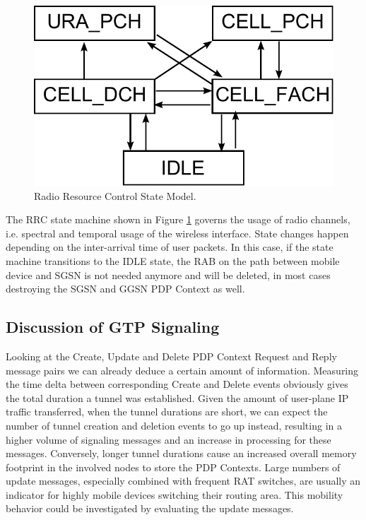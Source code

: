 \begin{figure}
	\centering
	\includegraphics[width=0.6\columnwidth]{images/CONEXT2012/rrc-state-model.pdf}
	\caption{Radio Resource Control State Model.}
	\label{fig:rrcstatemodel-CONEXT}
\end{figure}

The \ac{RRC} state machine shown in Figure \ref{fig:rrcstatemodel-CONEXT} governs the usage of radio channels, i.e. spectral and temporal usage of the wireless interface. State changes happen depending on the inter-arrival time of user packets. In this case, if the state machine transitions to the IDLE state, the \ac{RAB} on the path between mobile device and \ac{SGSN} is not needed anymore and will be deleted, in most cases destroying the SGSN and GGSN PDP Context as well.




\subsection{Discussion of GTP Signaling}

Looking at the Create, Update and Delete PDP Context Request and Reply message pairs we can already deduce a certain amount of information. Measuring the time delta between corresponding Create and Delete events obviously gives the total duration a tunnel was established. Given the amount of user-plane IP traffic transferred, when the tunnel durations are short, we can expect the number of tunnel creation and deletion events to go up instead, resulting in a higher volume of signaling messages and an increase in processing for these messages. Conversely, longer tunnel durations cause an increased overall memory footprint in the involved nodes to store the \ac{PDP} Contexts. Large numbers of update messages, especially combined with frequent \ac{RAT} switches, are usually an indicator for highly mobile devices switching their routing area. This mobility behavior could be investigated by evaluating the update messages.

